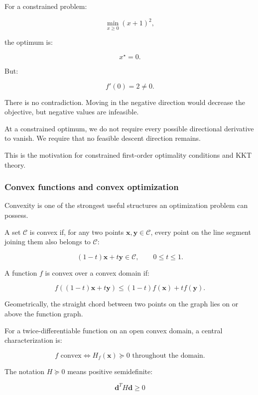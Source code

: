 \hypertarget{02-foundations-ii-ch026-boundary-optima-are-different}{}

For a constrained problem:

\[
\min_{x\ge0}(x+1)^2,
\]

the optimum is:

\[
x^\star=0.
\]

But:

\[
f'(0)=2\ne0.
\]

There is no contradiction. Moving in the negative direction would decrease the objective, but negative values are infeasible.

At a constrained optimum, we do not require every possible directional derivative to vanish. We require that no feasible descent direction remains.

This is the motivation for constrained first-order optimality conditions and KKT theory.

\subsubsection{Convex functions and convex optimization}\label{02-foundations-ii-ch026-convex-functions-and-convex-optimization}

\hypertarget{02-foundations-ii-ch026-convex-functions-and-convex-optimization}{}

Convexity is one of the strongest useful structures an optimization problem can possess.

A set \(\mathcal C\) is convex if, for any two points \(\mathbf x,\mathbf y\in\mathcal C\), every point on the line segment joining them also belongs to \(\mathcal C\):

\[
(1-t)\mathbf x+t\mathbf y\in\mathcal C, \qquad 0\le t\le1.
\]

A function \(f\) is convex over a convex domain if:

\[
\boxed{ f((1-t)\mathbf x+t\mathbf y) \le (1-t)f(\mathbf x)+tf(\mathbf y) }.
\]

Geometrically, the straight chord between two points on the graph lies on or above the function graph.

For a twice-differentiable function on an open convex domain, a central characterization is:

\[
\boxed{ f\text{ convex} \iff H_f(\mathbf x)\succeq0 \text{ throughout the domain} }.
\]

The notation \(H\succeq0\) means positive semidefinite:

\[
\mathbf d^TH\mathbf d\ge0
\]

